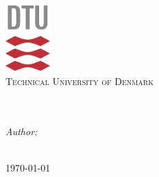 \documentclass[a4paper,10pt]{article}
\begin{document}
\pagestyle{empty} %



\title{\course \\ \Title}
\author{\authorsTitle}

\begin{titlepage}
\begin{center}
\includegraphics[height=1.00in]{tex_dtu_logo}\\[1.5cm]
\textsc{\LARGE Technical University of Denmark}\\[3.0cm]
\textsc{\Large \Title}\\[1.0cm]
\textsc{\large \courseTitle}\\[3.0cm]
\begin{flushleft} \large
\emph{Author:}\\
\authorsTitle \\

\end{flushleft}
\vfill
{\large \today}
\end{center}
\end{titlepage}



\tableofcontents %
\cleardoublepage %

\pagestyle{fancy} %






\end{document}
